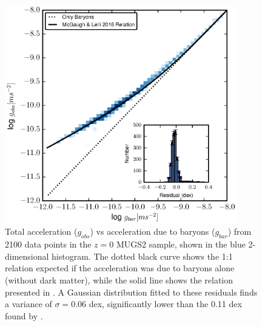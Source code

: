 \begin{figure}
    \includegraphics[width=0.9\textwidth]{figures4/SPARC_plot.eps}
    \caption{Total acceleration ($g_{obs}$) vs acceleration due to baryons
    ($g_{bar}$) from 2100 data points in the $z=0$ MUGS2 sample, shown in the
    blue 2-dimensional histogram.  The dotted black curve shows the 1:1 relation
    expected if the acceleration was due to baryons alone (without dark matter),
    while the solid line shows the relation presented in \citet{McGaugh2016}.
    A Gaussian distribution fitted to these residuals finds a
    variance of $\sigma=0.06$ dex, significantly lower than the 0.11 dex found
    by \citet{McGaugh2016}.} \label{SPARC_plot}
\end{figure}
